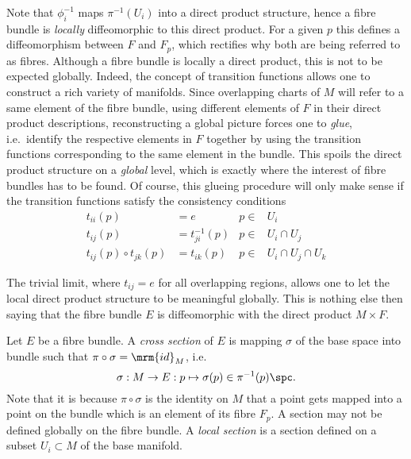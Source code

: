 \documentclass[10pt,reqno]{amsart}
\numberwithin{equation}{section}
\begin{document}
%
Note that $\phi_i^{-1}$ maps $\pi^{-1}(U_i)$ into a direct 
product structure, hence a fibre bundle is \emph{locally} 
diffeomorphic to this direct product. For a given $p$ this 
defines a diffeomorphism between $F$ and $F_p$, which rectifies 
why both are being referred to as fibres.  Although a fibre 
bundle is locally a direct product, this is not to be expected 
globally. Indeed, the concept of transition functions allows one 
to construct a rich variety of manifolds. Since overlapping 
charts of $M$ will refer to a same element of the fibre bundle, 
using different elements of $F$ in their direct product 
descriptions, reconstructing a global picture forces one to 
\emph{glue}, i.e.\ identify the respective elements in $F$ 
together by using the transition functions corresponding to the 
same element in the bundle.  This spoils the direct product 
structure on a \emph{global} level, which is exactly where the 
interest of fibre bundles has to be found. Of course, this 
glueing procedure will only make sense if the transition 
functions satisfy the consistency conditions
%
\begin{subequations}
	\begin{align}
		t_{ii}(p) &= e & p \in& U_i \\
		t_{ij}(p) &= t_{ji}^{-1}(p) & p \in& U_i \cap U_j \\
		t_{ij}(p) \circ t_{jk}(p) &= t_{ik}(p) & p \in& U_i \cap U_j 
		\cap U_k \end{align}
\end{subequations}
%

The trivial limit, where $t_{ij} = e$ for all overlapping 
regions, allows one to let the local direct product structure to 
be meaningful globally.  This is nothing else then saying that 
the fibre bundle $E$ is diffeomorphic with the direct product $M 
\times F$.

Let $E$ be a fibre bundle. A \emph{cross section} of $E$ is 
mapping $\sigma$ of the base space into bundle such that $\pi 
\circ \sigma = \mrm{id}_M$, i.e.\
%
\begin{equation}
	\sigma : M \rightarrow E : p \mapsto \sigma(p) \in 
	\pi^{-1}(p)\spc.
\end{equation}
%
Note that it is because $\pi \circ \sigma$ is the identity on $M$ 
that a point gets mapped into a point on the bundle which is an 
element of its fibre $F_p$. A section may not be defined globally 
on the fibre bundle. A \emph{local section} is a section defined 
on a subset $U_i \subset M$ of the base manifold.
\end{document}
